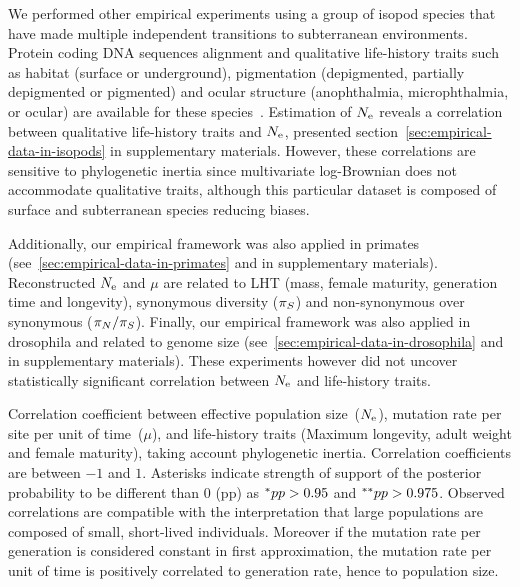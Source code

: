We performed other empirical experiments using a group of isopod species that have made multiple independent transitions to subterranean environments.
Protein coding \acrshort{DNA} sequences alignment and qualitative life-history traits such as habitat (surface or underground), pigmentation (depigmented, partially depigmented or pigmented) and ocular structure (anophthalmia, microphthalmia, or ocular) are available for these species~\citep{Saclier2018}.
Estimation of $N_{\mathrm{e}}$ reveals a correlation between qualitative life-history traits and $N_{\mathrm{e}}$, presented section~\ref{sec:empirical-data-in-isopods} in supplementary materials.
However, these correlations are sensitive to phylogenetic inertia since multivariate log-Brownian does not accommodate qualitative traits, although this particular dataset is composed of surface and subterranean species reducing biases.

Additionally, our empirical framework was also applied in primates (see~\ref{sec:empirical-data-in-primates} and in supplementary materials).
Reconstructed $N_{\mathrm{e}}$ and $\mu$ are related to \acrshort{LHT} (mass, female maturity, generation time and longevity), synonymous diversity ($\pi_S$) and non-synonymous over synonymous ($\pi_N / \pi_S$).
Finally, our empirical framework was also applied in drosophila and related to genome size (see~\ref{sec:empirical-data-in-drosophila} and in supplementary materials).
These experiments however did not uncover statistically significant correlation between $N_{\mathrm{e}}$ and life-history traits.

\begin{table}[htbp]
    
    \caption[Traits correlation]{
    Correlation coefficient between effective population size~($N_{\mathrm{e}}$), mutation rate per site per unit of time~($\mu$), and life-history traits (Maximum longevity, adult weight and female maturity), taking account phylogenetic inertia.
    Correlation coefficients are between $-1$ and $1$.
    Asterisks indicate strength of support of the posterior probability to be different than $0$ (pp) as $\smash{^{*}} pp > 0.95$ and $\smash{^{**}} pp > 0.975$.
    Observed correlations are compatible with the interpretation that large populations are composed of small, short-lived individuals.
    Moreover if the mutation rate per generation is considered constant in first approximation, the mutation rate per unit of time is positively correlated to generation rate, hence to population size.
    }
    \label{fig:mammals_correlation}
\end{table}


